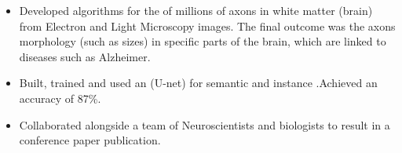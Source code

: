\documentclass[10pt,a4paper,ragged2e,withhyper]{altacv}
\begin{document}
\begin{paracol}{2}
        
        
        \newpage
        
        
        \switchcolumn

        
            \begin{itemize}
                \item Developed algorithms for the  of millions of axons in white matter (brain) from Electron and Light Microscopy images. The final outcome was the axons morphology (such as sizes) in specific parts of the brain, which are linked to diseases such as Alzheimer.
                \item Built, trained and used an  (U-net) for semantic and instance .Achieved an  accuracy of 87\%.
                \item Collaborated alongside a team of
                Neuroscientists and biologists to result in a conference paper publication.
            \end{itemize}
            \divider
            
            \begin{itemize}
            

\end{itemize}
\end{paracol}
\end{document}
